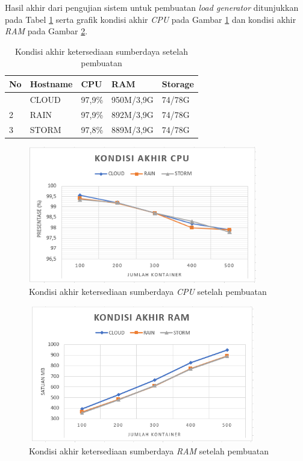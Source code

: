 				Hasil akhir dari pengujian sistem untuk pembuatan \textit{load generator} ditunjukkan pada Tabel \ref{suberdayasetpembuatan} serta grafik  kondisi akhir \textit{CPU} pada Gambar \ref{pembuatancpu} dan kondisi akhir \textit{RAM} pada Gambar \ref{pembuatanram}.
				\begin{longtable}{|p{}|p{}|p{}|p{}|p{}|}
					\caption{Kondisi akhir ketersediaan sumberdaya setelah pembuatan} \label{suberdayasetpembuatan} \\
					\hline
					\textbf{No} & \textbf{Hostname} & \textbf{CPU} & \textbf{RAM} & \textbf{Storage} \\ \hline
					\endhead
					\endfoot
					\endlastfoot
					1 & CLOUD & 97,9\% & 950M/3,9G & 74/78G \\ \hline
					2 & RAIN & 97,9\% & 892M/3,9G & 74/78G \\ \hline
					3 & STORM & 97,8\% & 889M/3,9G & 74/78G \\ \hline
				\end{longtable}
			
				\begin{figure}[H]
					\centering
					\includegraphics[width=10cm,height=6cm]{Images/C-5/pembuatancpu.PNG}
					\caption{Kondisi akhir ketersediaan sumberdaya \textit{CPU} setelah pembuatan}
					\label{pembuatancpu}
				\end{figure}
			
				\begin{figure}[H]
					\centering
					\includegraphics[width=10cm,height=6cm]{Images/C-5/pembuatanram.PNG}
					\caption{Kondisi akhir ketersediaan sumberdaya \textit{RAM} setelah pembuatan}
					\label{pembuatanram}
				\end{figure}
			
